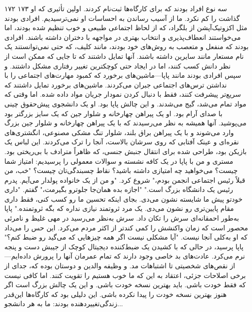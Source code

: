 ۱۷۲ ۱۷۳  
سه نوع افراد بودند که برای کارگاه‌ها ثبت‌نام کردند. اولین تأثیری که او گذاشت را کم نکرد. ما از آسیب رساندن به احساسات او نمی‌ترسیدیم.  
افرادی بودند مثل اکزوتیک‌آپشن از بلگراد، که از لحاظ اجتماعی طبیعی و خوب تنظیم شده بودند، اما می‌خواستند انعطاف‌پذیری و انتخاب بهتری در مواجهه با دختران داشته باشند. افرادی بودند که منفعل و متعصب به روش‌های خود بودند، مانند کلیف، که حتی نمی‌توانستند یک نام مستعار مانند سایرین داشته باشند. آنها تمایل داشتند که تا جایی که ممکن است از نظر دانش کسب کنند، اما در ایجاد حتی کوچکترین تغییر رفتاری مشکل داشتند. و سپس افرادی بودند مانند پاپا—ماشین‌های برخورد که کمبود مهارت‌های اجتماعی را با نداشتن ترس‌های اجتماعی جبران می‌کردند. ماشین‌های برخورد تمایل داشتند که سریع‌تر پیشرفت کنند، فقط با دنبال کردن نمودار جریان مواد داده شده. اما وقتی که مواد تمام می‌شد، گیج می‌شدند.  
و این چالش پاپا بود. او یک دانشجوی پیش‌حقوق چینی با صدای آرام بود. او یک پیراهن چهارخانه و شلوار جین که یک سایز بزرگتر بود می‌پوشید. آنها همیشه به نظر می‌رسیدند که با یک پیراهن چهارخانه و شلوار جین بزرگ وارد می‌شوند و با یک پیراهن براق بلند، شلوار تنگ مشکی مصنوعی، انگشتری‌های نقره‌ای و عینک آفتابی که روی سرشان بالاست، آنجا را ترک می‌کردند. این لباس یک بازیکن بود، طراحی شده برای انتقال جنبش جنسی، که ظاهراً مترادف با بی‌ریختی بود.  
مستری و من با پاپا در یک کافه نشسته و سوالات معمولی را پرسیدیم: امتیاز شما چیست؟ می‌خواهید چه امتیازی داشته باشید؟ نقاط چسبندگی‌تان چیست؟  
"خب، من قبلاً رئیس اجتماعی انجمن بودم،" شروع کرد. "و من از یک خانواده پولدار می‌آیم. پدرم رئیس یک دانشگاه بزرگ است."  
"اجازه بده همان‌جا جلوترو بگیرمت،" گفتم. "داری خودتو پیش ما شایسته نشون می‌دی. بجای اینکه تحسین ما رو کسب کنی، فقط داری مقام پایین‌تری رو نشون می‌دی. یک مرد ثروتمند نیازی نداره که بگه ثروتمنده."  
پاپا به‌طور احمقانه‌ای سرش را تکان داد. سرش به‌نظر می‌رسید در مهی غلیظ و نامرئی محصور است که زمان واکنشش را کمی کندتر از اکثر مردم می‌کرد. این حس را می‌داد که او به‌کلی آنجا نیست.  
"آیا مشکلی نیست اگر همه چیزهایی که می‌گید رو ضبط کنم؟" پاپا پرسید، در حالی که با کشیدن یک ضبط‌کننده دیجیتال کوچک از جیبش دست و پنجه نرم می‌کرد.  
عادت‌های بد خاصی وجود دارند که تمام عمرمان آنها را پرورش داده‌ایم—از نقص‌های شخصیتی تا اشتباهات مد. و وظیفه والدین و دوستان بوده که، جدای از برخی اصلاحات جزئی، اعتقاد به این که ما خوب هستیم را تقویت کنند. اما کافی نیست که فقط خودت باشی. باید بهترین نسخه خودت باشی. و این یک چالش بزرگ است اگر هنوز بهترین نسخه خودت را پیدا نکرده باشی.  
این دلیلی بود که کارگاه‌ها این‌قدر زندگی‌تغییر‌دهنده بودند: ما به هر دانشجو...
